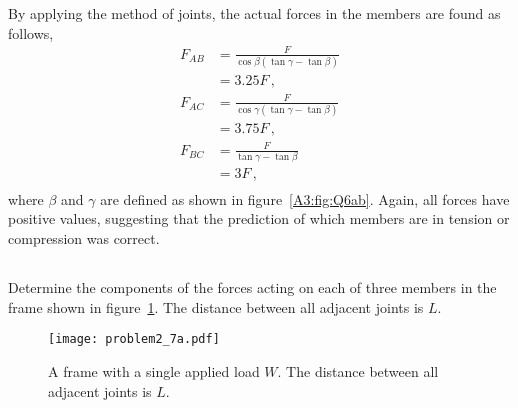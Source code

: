 \documentclass[a4paper,justified,oneside]{tufte-handout}
\numberwithin{equation}{subsection}
\begin{document}
\begin{solution}
By applying the method of joints, the actual forces in the members are found as follows,
\begin{align*}
	F_{AB}	&=	\frac{F}{\cos\beta\left(\tan\gamma -\tan\beta\right)}	\\
			&=	3.25 F	\,,	\\
	F_{AC}	&=	\frac{F}{\cos\gamma\left(\tan\gamma -\tan\beta\right)}	\\
			&=	3.75 F	\,,	\\
	F_{BC}	&=	\frac{F}{\tan\gamma -\tan\beta}	\\
			&=	3 F	\,,	\\		
\end{align*}
where $\beta$ and $\gamma$ are defined as shown in figure~\ref{A3:fig:Q6ab}. Again, all forces have positive values, suggesting that the prediction of which members are in tension or compression was correct.
\end{solution}

\clearpage
\subsection{}\label{A3:sec:frame1}
Determine the components of the forces acting on each of three members in the frame shown in figure~\ref{A3:fig:Q7a}. The distance between all adjacent joints is $L$.
\begin{figure}
	\centering
	\texttt{[image: problem2\_7a.pdf]}
	\caption{A frame with a single applied load $W$. The distance between all adjacent joints is $L$.}
	\label{A3:fig:Q7a}
\end{figure}
\end{document}
